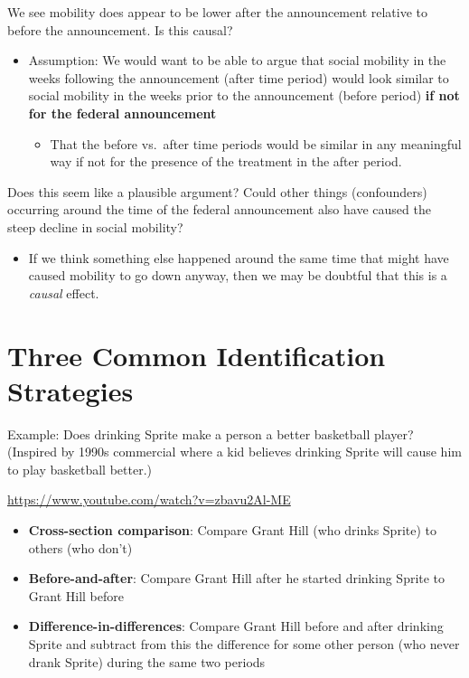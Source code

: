 \documentclass[
  letterpaper,
  DIV=11,
  numbers=noendperiod]{scrreprt}
\providecommand{\tightlist}{%
  \setlength{\itemsep}{0pt}\setlength{\parskip}{0pt}}\usepackage{longtable,booktabs,array}
\begin{document}
We see mobility does appear to be lower after the announcement relative
to before the announcement. Is this causal?

\begin{itemize}
\tightlist
\item
  Assumption: We would want to be able to argue that social mobility in
  the weeks following the announcement (after time period) would look
  similar to social mobility in the weeks prior to the announcement
  (before period) \textbf{if not for the federal announcement}

  \begin{itemize}
  \tightlist
  \item
    That the before vs.~after time periods would be similar in any
    meaningful way if not for the presence of the treatment in the after
    period.
  \end{itemize}
\end{itemize}

Does this seem like a plausible argument? Could other things
(confounders) occurring around the time of the federal announcement also
have caused the steep decline in social mobility?

\begin{itemize}
\tightlist
\item
  If we think something else happened around the same time that might
  have caused mobility to go down anyway, then we may be doubtful that
  this is a \emph{causal} effect.
\end{itemize}

\hypertarget{three-common-identification-strategies}{%
\section{Three Common Identification
Strategies}\label{three-common-identification-strategies}}

Example: Does drinking Sprite make a person a better basketball player?
(Inspired by 1990s commercial where a kid believes drinking Sprite will
cause him to play basketball better.)

\url{https://www.youtube.com/watch?v=zbavu2Al-ME}

\begin{itemize}
\tightlist
\item
  \textbf{Cross-section comparison}: Compare Grant Hill (who drinks
  Sprite) to others (who don't)
\item
  \textbf{Before-and-after}: Compare Grant Hill after he started
  drinking Sprite to Grant Hill before
\item
  \textbf{Difference-in-differences}: Compare Grant Hill before and
  after drinking Sprite and subtract from this the difference for some
  other person (who never drank Sprite) during the same two periods
\end{itemize}
\end{document}
